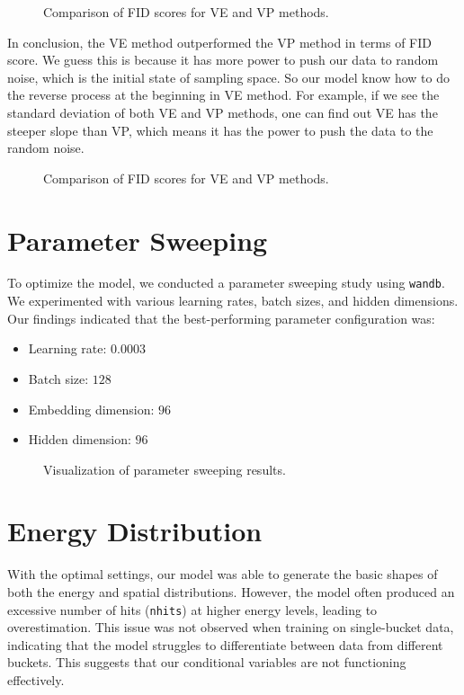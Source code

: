 \begin{figure}[h!]
    \centering
    \caption{Comparison of FID scores for VE and VP methods.}
\end{figure}

In conclusion, the VE method outperformed the VP method in terms of FID score. 
We guess this is because it has more power to push our data to random noise, which is the initial state of sampling space. So our model know how to do the reverse process at the beginning in VE method. For example, if we see the standard deviation of both VE and VP methods, one can find out VE has the steeper slope than VP, which means it has the power to push the data to the random noise.

\begin{figure}[h!]
    \centering
    \caption{Comparison of FID scores for VE and VP methods.}
\end{figure}

\section{Parameter Sweeping}
To optimize the model, we conducted a parameter sweeping study using \texttt{wandb}. We experimented with various learning rates, batch sizes, and hidden dimensions. Our findings indicated that the best-performing parameter configuration was:
\begin{itemize}
    \item Learning rate: $0.0003$
    \item Batch size: $128$
    \item Embedding dimension: $96$
    \item Hidden dimension: $96$
\end{itemize}

\begin{figure}[h!]
    \centering
    \caption{Visualization of parameter sweeping results.}
\end{figure}

\section{Energy Distribution}
With the optimal settings, our model was able to generate the basic shapes of both the energy and spatial distributions. However, the model often produced an excessive number of hits (\texttt{nhits}) at higher energy levels, leading to overestimation. This issue was not observed when training on single-bucket data, indicating that the model struggles to differentiate between data from different buckets. This suggests that our conditional variables are not functioning effectively.

